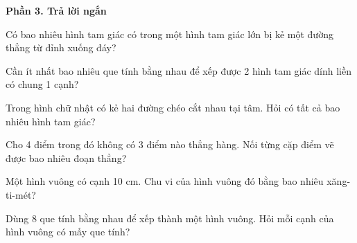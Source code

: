 \textbf{Phần 3. Trả lời ngắn}

\begin{ex} %
Có bao nhiêu hình tam giác có trong một hình tam giác lớn bị kẻ một đường thẳng từ đỉnh xuống đáy?
\end{ex}

\begin{ex} %
Cần ít nhất bao nhiêu que tính bằng nhau để xếp được 2 hình tam giác dính liền có chung 1 cạnh?
\end{ex}

\begin{ex} %
Trong hình chữ nhật có kẻ hai đường chéo cắt nhau tại tâm. Hỏi có tất cả bao nhiêu hình tam giác?
\end{ex}

\begin{ex} %
Cho 4 điểm trong đó không có 3 điểm nào thẳng hàng. Nối từng cặp điểm vẽ được bao nhiêu đoạn thẳng?
\end{ex}

\begin{ex} %
Một hình vuông có cạnh 10 cm. Chu vi của hình vuông đó bằng bao nhiêu xăng-ti-mét?
\end{ex}

\begin{ex} %
Dùng 8 que tính bằng nhau để xếp thành một hình vuông. Hỏi mỗi cạnh của hình vuông có mấy que tính?
\end{ex}
